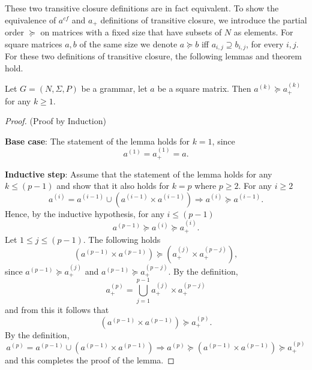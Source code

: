 These two transitive closure definitions are in fact equivalent. To show the equivalence of $a^{cf}$ and $a_+$ definitions of transitive closure, we introduce the partial order $\succeq$ on matrices with a fixed size that have subsets of $N$ as elements. For square matrices $a, b$ of the same size we denote $a \succeq b$ iff $a_{i,j} \supseteq b_{i,j}$, for every $i, j$. For these two definitions of transitive closure, the following lemmas and theorem hold.

\begin{lemma}\label{lemma:cf_geq_valiant}
	Let $G =(N,\Sigma,P)$ be a grammar, let $a$ be a square matrix. Then $a^{(k)} \succeq a^{(k)}_+$ for any $k \geq 1$.
\end{lemma}
\begin{proof}(Proof by Induction)
	
	\textbf{Base case}: The statement of the lemma holds for $k = 1$, since $$a^{(1)} = a^{(1)}_+ = a.$$
	
	\textbf{Inductive step}: Assume that the statement of the lemma holds for any $k \leq (p - 1)$ and show that it also holds for $k = p$ where $p \geq 2$. For any $i \geq 2$ $$a^{(i)} = a^{(i-1)} \cup (a^{(i-1)} \times a^{(i-1)}) \Rightarrow a^{(i)} \succeq a^{(i-1)}.$$ Hence, by the inductive hypothesis, for any $i \leq (p-1)$ $$a^{(p-1)} \succeq a^{(i)} \succeq a^{(i)}_+.$$ Let $1 \leq j \leq (p - 1)$. The following holds $$(a^{(p-1)} \times a^{(p-1)}) \succeq (a^{(j)}_+ \times a^{(p-j)}_+),$$ since $a^{(p-1)} \succeq a^{(j)}_+$ and $a^{(p-1)} \succeq a^{(p-j)}_+$. By the definition, $$a^{(p)}_+ = \bigcup^{p-1}_{j=1}{a^{(j)}_+ \times a^{(p-j)}_+}$$ and from this it follows that $$(a^{(p-1)} \times a^{(p-1)}) \succeq a^{(p)}_+.$$ By the definition, $$a^{(p)} = a^{(p-1)} \cup (a^{(p-1)} \times a^{(p-1)}) \Rightarrow a^{(p)} \succeq (a^{(p-1)} \times a^{(p-1)}) \succeq a^{(p)}_+$$ and this completes the proof of the lemma.
\end{proof}


